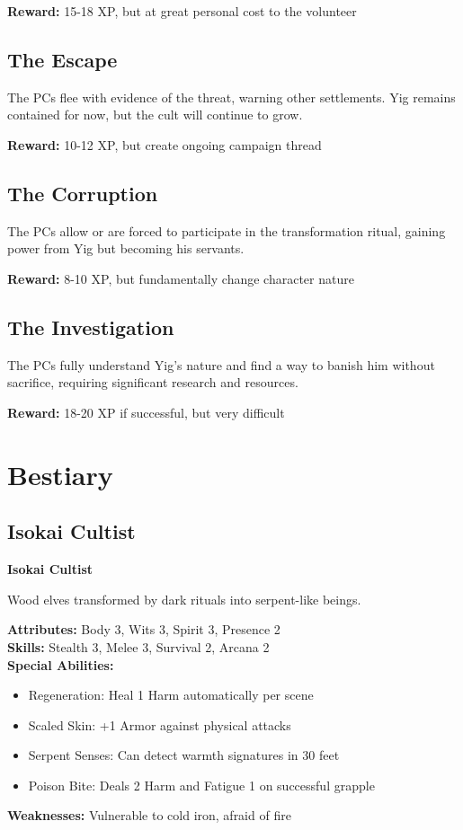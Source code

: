 \documentclass[12pt,twoside]{article}
\newenvironment{npcbox}[1]{
  \begin{mdframed}[
    linewidth=1pt,
    linecolor=dungeongray,
    backgroundcolor=white,
    innertopmargin=5pt,
    innerbottommargin=5pt,
    innerrightmargin=5pt,
    innerleftmargin=5pt
  ]
  \textbf{#1}
}{\end{mdframed}}
\begin{document}
\textbf{Reward:} 15-18 XP, but at great personal cost to the volunteer

\subsection{The Escape}

The PCs flee with evidence of the threat, warning other settlements. Yig remains contained for now, but the cult will continue to grow.

\textbf{Reward:} 10-12 XP, but create ongoing campaign thread

\subsection{The Corruption}

The PCs allow or are forced to participate in the transformation ritual, gaining power from Yig but becoming his servants.

\textbf{Reward:} 8-10 XP, but fundamentally change character nature

\subsection{The Investigation}

The PCs fully understand Yig's nature and find a way to banish him without sacrifice, requiring significant research and resources.

\textbf{Reward:} 18-20 XP if successful, but very difficult

\section{Bestiary}

\subsection{Isokai Cultist}

\begin{npcbox}{Isokai Cultist}
Wood elves transformed by dark rituals into serpent-like beings.

\textbf{Attributes:} Body 3, Wits 3, Spirit 3, Presence 2 \\
\textbf{Skills:} Stealth 3, Melee 3, Survival 2, Arcana 2 \\
\textbf{Special Abilities:}
\begin{itemize}
  \item Regeneration: Heal 1 Harm automatically per scene
  \item Scaled Skin: +1 Armor against physical attacks
  \item Serpent Senses: Can detect warmth signatures in 30 feet
  \item Poison Bite: Deals 2 Harm and Fatigue 1 on successful grapple
\end{itemize}
\textbf{Weaknesses:} Vulnerable to cold iron, afraid of fire
\end{npcbox}
\end{document}
